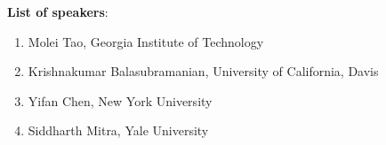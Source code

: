 \begin{talk}
\medskip
\textbf{List of speakers}: 
\begin{enumerate}
    \item Molei Tao, Georgia Institute of Technology 
    \item Krishnakumar Balasubramanian, University of California, Davis
    \item Yifan Chen, New York University
    \item Siddharth Mitra, Yale University
\end{enumerate}



  
\end{talk}

